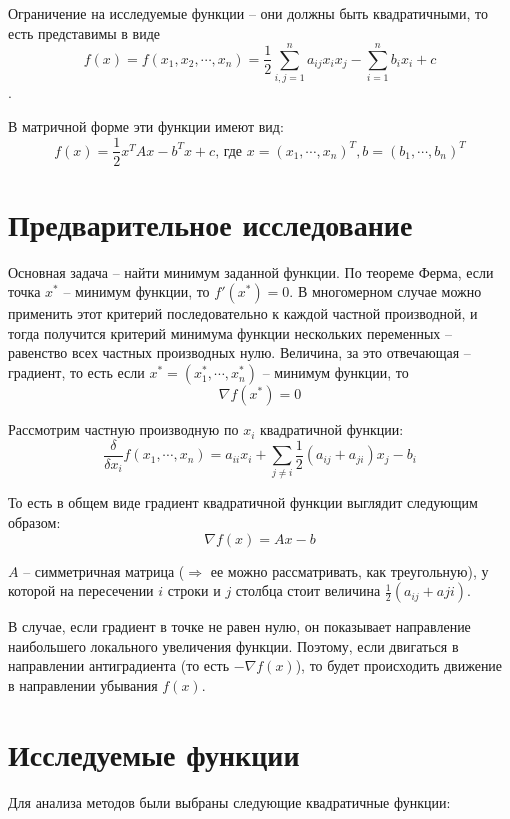 \documentclass[12pt]{article}
\begin{document}
Ограничение на исследуемые функции -- они должны быть квадратичными, то есть представимы в виде
\[ f(x) = f(x_1, x_2, \cdots, x_n) = \frac{1}{2} \sum_{i, j = 1}^n a_{ij} x_i x_j - \sum_{i=1}^n b_i x_i + c\].

В матричной форме эти функции имеют вид:
\[ f(x) = \frac{1}{2} x^T Ax - b^Tx + c  \text{, где } x = (x_1, \cdots, x_n)^T, b = (b_1, \cdots, b_n)^T \]

\section{Предварительное исследование}

Основная задача -- найти минимум заданной функции. По теореме Ферма, если точка $x^*$ -- минимум функции, то $f'(x^*) = 0$. В многомерном случае можно применить этот критерий последовательно к каждой частной производной, и тогда получится критерий минимума функции нескольких переменных -- равенство всех частных производных нулю. Величина, за это отвечающая -- градиент, то есть если $x^* = (x_1^*, \cdots, x_n^*)$ -- минимум функции, то
\[ \nabla f(x^*) = 0 \]

Рассмотрим частную производную по $x_i$ квадратичной функции:
\[ \frac{\delta}{\delta x_i}f(x_1, \cdots, x_n) = a_{ii}x_i + \sum_{j \neq i} \frac{1}{2} (a_{ij}+a_{ji})x_j - b_i \]

То есть в общем виде градиент квадратичной функции выглядит следующим образом:
\[ \nabla f(x) = Ax-b \]

$A$ -- симметричная матрица ($\Rightarrow$ ее можно рассматривать, как треугольную), у которой на пересечении $i$ строки и $j$ столбца стоит величина $\frac{1}{2}(a_{ij}+a{ji})$.

В случае, если градиент в точке не равен нулю, он показывает направление наибольшего локального увеличения функции. Поэтому, если двигаться в направлении антиградиента (то есть $-\nabla f(x)$), то будет происходить движение в направлении убывания $f(x)$.

\section{Исследуемые функции}

Для анализа методов были выбраны следующие квадратичные функции:
\end{document}
